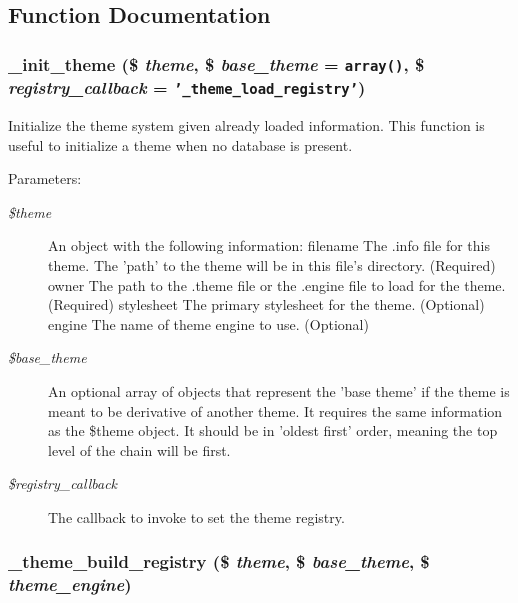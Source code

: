 \subsection{Function Documentation}
\hypertarget{includes_2theme_8inc_4311bff320dfcb10890b3892a163d711}{
\subsubsection[{\_\-init\_\-theme}]{\setlength{\rightskip}{0pt plus 5cm}\_\-init\_\-theme (\$ {\em theme}, \/  \$ {\em base\_\-theme} = {\tt array()}, \/  \$ {\em registry\_\-callback} = {\tt '\_\-theme\_\-load\_\-registry'})}}
\label{includes_2theme_8inc_4311bff320dfcb10890b3892a163d711}


Initialize the theme system given already loaded information. This function is useful to initialize a theme when no database is present.

\begin{Desc}
\item[Parameters:]
\begin{description}
\item[{\em \$theme}]An object with the following information: filename The .info file for this theme. The 'path' to the theme will be in this file's directory. (Required) owner The path to the .theme file or the .engine file to load for the theme. (Required) stylesheet The primary stylesheet for the theme. (Optional) engine The name of theme engine to use. (Optional) \item[{\em \$base\_\-theme}]An optional array of objects that represent the 'base theme' if the theme is meant to be derivative of another theme. It requires the same information as the \$theme object. It should be in 'oldest first' order, meaning the top level of the chain will be first. \item[{\em \$registry\_\-callback}]The callback to invoke to set the theme registry. \end{description}
\end{Desc}
\hypertarget{includes_2theme_8inc_4a1f9a033ff57b119d18697763909f3d}{
\subsubsection[{\_\-theme\_\-build\_\-registry}]{\setlength{\rightskip}{0pt plus 5cm}\_\-theme\_\-build\_\-registry (\$ {\em theme}, \/  \$ {\em base\_\-theme}, \/  \$ {\em theme\_\-engine})}}
\label{includes_2theme_8inc_4a1f9a033ff57b119d18697763909f3d}


